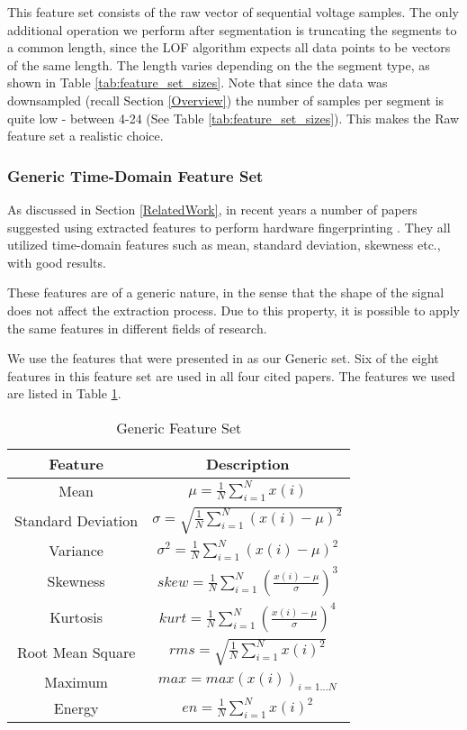 \documentclass[conference]{IEEEtran}
\begin{document}
  This feature set consists of the raw vector of sequential voltage samples. The only additional operation we perform after segmentation is truncating the segments to a common length, since the LOF algorithm expects all data points to be vectors of the same length. The length varies depending on the the segment type, as shown in Table \ref{tab:feature_set_sizes}. Note that since the data was downsampled (recall Section \ref{Overview}) the number of samples per segment is quite low - between 4-24 (See Table \ref{tab:feature_set_sizes}). This makes the Raw feature set a realistic choice.
  
\subsubsection{Generic Time-Domain Feature Set}
  As discussed in Section \ref{RelatedWork}, in recent years a number of papers suggested using extracted features to perform hardware fingerprinting \cite{dey2014accelprint, choi2018identifying, choi2018voltageids, kneib2018scission}. They all utilized time-domain features such as mean, standard deviation, skewness etc., with good results.
  
  These features are of a generic nature, in the sense that the shape of the signal does not affect the extraction process. Due to this property, it is possible to apply the same features in different fields of research.
  
  We use the features that were presented in \cite{kneib2018scission} as our Generic set. Six of the eight features in this feature set are used in all four cited papers. The features we used are listed in Table \ref{tab:generic_feature_set}.
  
  \begin{table}
    \caption{Generic Feature Set}
    \label{tab:generic_feature_set}
    \centering
    \begin{tabular}{|c c|} 
      \hline
      Feature & Description \\ [0.5ex] 
      \hline\hline
      Mean & \(\mu = \frac{1}{N}\sum_{i=1}^{N}x(i)\) \\
      \hline
      Standard Deviation & \(\sigma = \sqrt{\frac{1}{N}\sum_{i=1}^{N}(x(i)-\mu)^2}\) \\
      \hline
      Variance & \(\sigma^2 = \frac{1}{N}\sum_{i=1}^{N}(x(i)-\mu)^2\) \\
      \hline
      Skewness & \(skew = \frac{1}{N} \sum_{i=1}^{N}(\frac{x(i)-\mu}{\sigma})^3\) \\
      \hline
      Kurtosis & \(kurt = \frac{1}{N} \sum_{i=1}^{N}(\frac{x(i)-\mu}{\sigma})^4\) \\
      \hline
      Root Mean Square & \(rms = \sqrt{\frac{1}{N}\sum_{i=1}^{N}x(i)^2}\) \\
      \hline
      Maximum & \(max = max(x(i))_{i=1...N}\) \\
      \hline
      Energy & \(en = \frac{1}{N}\sum_{i=1}^{N}x(i)^2\) \\
      \hline
    \end{tabular}
  \end{table}
  
\end{document}
